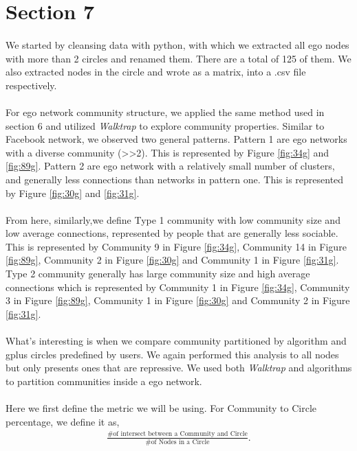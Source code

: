 \section*{Section 7}
\paragraph{}
We started by cleansing data with python, with which we extracted all ego nodes with more than 2 circles and renamed them. There are a total of 125 of them. We also extracted nodes in the circle and wrote as a matrix, into a .csv file respectively.
\paragraph{}
For ego network community structure, we applied the same method used in section 6 and utilized \textit{Walktrap} to explore community properties. Similar to Facebook network, we observed two general patterns. Pattern 1 are ego networks with a diverse community (>>2). This is represented by Figure \ref{fig:34g} and \ref{fig:89g}. Pattern 2 are ego network with a relatively small number of clusters, and generally less connections than networks in pattern one. This is represented by Figure \ref{fig:30g} and \ref{fig:31g}.
\paragraph{}
From here,  similarly,we define Type 1 community with low community size and low average connections, represented by people that are generally less sociable. This is represented by  Community 9 in Figure \ref{fig:34g}, Community 14 in Figure \ref{fig:89g}, Community 2 in Figure \ref{fig:30g} and Community 1 in Figure \ref{fig:31g}. Type 2 community generally has large community size and high average connections which is represented by Community 1 in Figure \ref{fig:34g}, Community 3 in Figure \ref{fig:89g}, Community 1 in Figure \ref{fig:30g} and Community 2 in Figure \ref{fig:31g}.
\paragraph{}
What's interesting is when we compare community partitioned by algorithm and gplus circles predefined by users. We again performed this analysis to all nodes but only presents ones that are repressive. We used both \textit{Walktrap} and  algorithms to partition communities inside a ego network.
\paragraph{}
Here we first define the metric we will be using. For Community to Circle percentage, we define it as,
\begin{align*}
\frac{\text{\# of intersect between a Community and Circle}}{\text{\# of Nodes in a Circle}}.
\end{align*}
